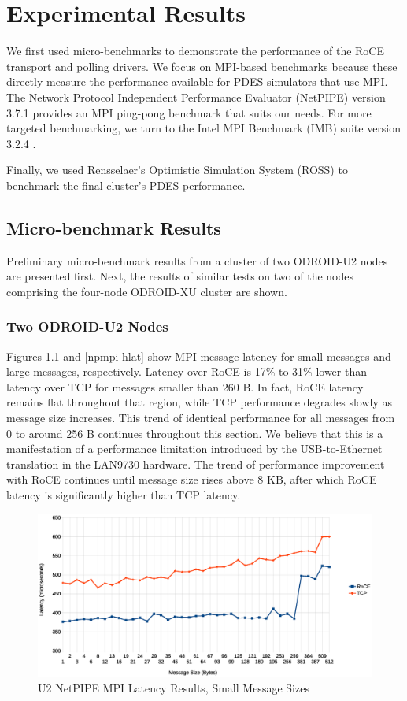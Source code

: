 \documentclass[11pt]{book}
\begin{document}
\chapter{Experimental Results}\label{results}

We first used micro-benchmarks to demonstrate the performance of the RoCE transport and
polling drivers.  We focus on MPI-based benchmarks because these directly measure the
performance available for PDES simulators that use MPI.  The Network Protocol Independent
Performance Evaluator (NetPIPE) \cite{NetPIPE} version 3.7.1 provides an MPI ping-pong
benchmark that suits our needs.  For more targeted benchmarking, we turn to the Intel MPI
Benchmark (IMB) suite version 3.2.4 \cite{intel-mpi}.

Finally, we used Rensselaer's Optimistic Simulation System (ROSS) to benchmark
the final cluster's PDES performance.

\section{Micro-benchmark Results}

Preliminary micro-benchmark results from a cluster of two ODROID-U2 nodes are presented
first.  Next, the results of similar tests on two of the nodes comprising the four-node
ODROID-XU cluster are shown.

\subsection{Two ODROID-U2 Nodes}

Figures \ref{npmpi-llat} and \ref{npmpi-hlat} show MPI message latency for small messages
and large messages, respectively.  Latency over RoCE is 17\% to 31\% lower than latency
over TCP for messages smaller than 260 B.  In fact, RoCE latency remains flat throughout
that region, while TCP performance degrades slowly as message size increases.  This trend
of identical performance for all messages from 0 to around 256 B continues throughout this
section.  We believe that this is a manifestation of a performance limitation introduced
by the USB-to-Ethernet translation in the LAN9730 hardware.  The trend of performance
improvement with RoCE continues until message size rises above 8 KB, after which RoCE
latency is significantly higher than TCP latency.


\begin{figure}
\includegraphics[width=\textwidth]{netpipe_lat_small}
\caption{U2 NetPIPE MPI Latency Results, Small Message Sizes}\label{npmpi-llat}
\end{figure}
\end{document}
